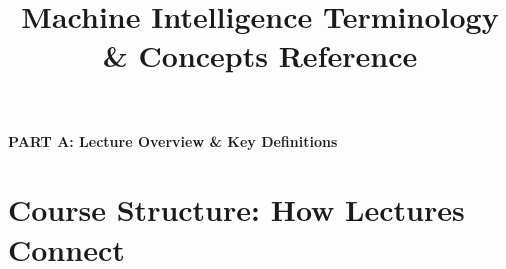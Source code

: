 \documentclass[11pt,a4paper]{article}
\title{\textbf{Machine Intelligence Terminology \& Concepts Reference}}
\author{}
\date{}
\begin{document}
\maketitle
\vspace{-2em}

\tableofcontents

\newpage

\begin{center}
\textbf{\LARGE PART A: Lecture Overview \& Key Definitions}
\end{center}
\vspace{1em}

\renewcommand{\thesection}{A.\arabic{section}}
\setcounter{section}{0}
\section{Course Structure: How Lectures Connect}
\end{document}
